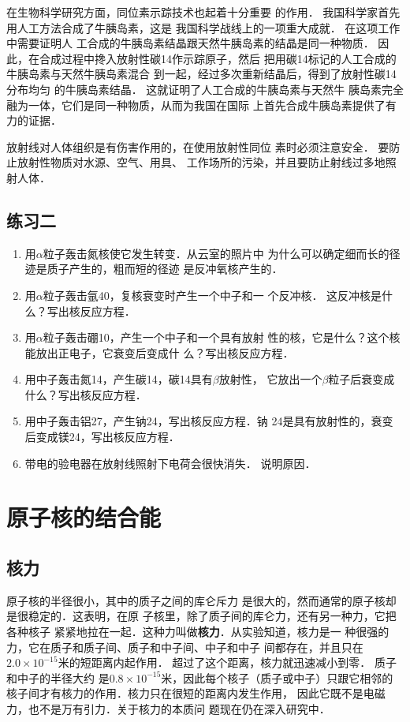 在生物科学研究方面，同位素示踪技术也起着十分重要
的作用．
我国科学家首先用人工方法合成了牛胰岛素，这是
我国科学战线上的一项重大成就．
在这项工作中需要证明人
工合成的牛胰岛素结晶跟天然牛胰岛素的结晶是同一种物质．
因此，在合成过程中搀入放射性碳14作示踪原子，然后
把用碳14标记的人工合成的牛胰岛素与天然牛胰岛素混合
到一起，经过多次重新结晶后，得到了放射性碳14分布均匀
的牛胰岛素结晶．
这就证明了人工合成的牛胰岛素与天然牛
胰岛素完全融为一体，它们是同一种物质，从而为我国在国际
上首先合成牛胰岛素提供了有力的证据．

放射线对人体组织是有伤害作用的，在使用放射性同位
素时必须注意安全．
要防止放射性物质对水源、空气、用具、
工作场所的污染，并且要防止射线过多地照射人体．


\subsection*{练习二}

\begin{enumerate}
    \item 用$\alpha$粒子轰击氮核使它发生转变．从云室的照片中
    为什么可以确定细而长的径迹是质子产生的，粗而短的径迹
    是反冲氧核产生的．
    \item 用$\alpha$粒子轰击氩40，复核衰变时产生一个中子和一
    个反冲核．
    这反冲核是什么？写出核反应方程．
    \item 用$\alpha$粒子轰击硼10，产生一个中子和一个具有放射
    性的核，它是什么？这个核能放出正电子，它衰变后变成什
    么？写出核反应方程．
    \item 用中子轰击氮14，产生碳14，碳14具有$\beta$放射性，
    它放出一个$\beta$粒子后衰变成什么？写出核反应方程．
    \item 用中子轰击铝27，产生钠24，写出核反应方程．钠
    24是具有放射性的，衰变后变成镁24，写出核反应方程．
    \item 带电的验电器在放射线照射下电荷会很快消失．
    说明原因．
\end{enumerate}


\section{原子核的结合能}
\subsection{核力} 

原子核的半径很小，其中的质子之间的库仑斥力
是很大的，然而通常的原子核却是很稳定的．这表明，在原
子核里，除了质子间的库仑力，还有另一种力，它把各种核子
紧紧地拉在一起．这种力叫做\textbf{核力}．从实验知道，核力是一
种很强的力，它在质子和质子间、质子和中子间、中子和中子
间都存在，并且只在$2.0\times10^{-15}$米的短距离内起作用．
超过了这个距离，核力就迅速减小到零．
质子和中子的半径大约
是$0.8\times10^{-15}$米，因此每个核子（质子或中子）只跟它相邻的
核子间才有核力的作用．核力只在很短的距离内发生作用，
因此它既不是电磁力，也不是万有引力．关于核力的本质问
题现在仍在深入研究中．

